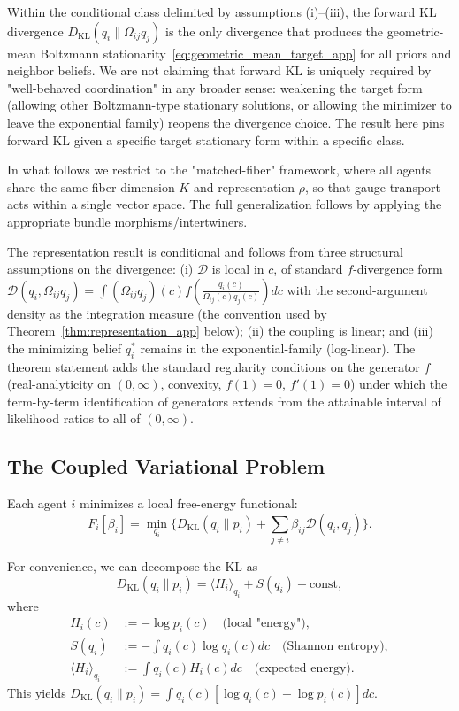 \documentclass[11pt]{article}
\begin{document}
Within the conditional class delimited by assumptions (i)--(iii), the forward KL divergence $D_{\mathrm{KL}}(q_i \| \Omega_{ij} q_j)$ is the only divergence that produces the geometric-mean Boltzmann stationarity~\eqref{eq:geometric_mean_target_app} for all priors and neighbor beliefs. We are not claiming that forward KL is uniquely required by "well-behaved coordination" in any broader sense: weakening the target form (allowing other Boltzmann-type stationary solutions, or allowing the minimizer to leave the exponential family) reopens the divergence choice. The result here pins forward KL given a specific target stationary form within a specific class.

In what follows we restrict to the "matched-fiber" framework, where all agents share the same fiber dimension $K$ and representation $\rho$, so that gauge transport acts within a single vector space. The full generalization follows by applying the appropriate bundle morphisms/intertwiners.

The representation result is conditional and follows from three structural assumptions on the divergence: (i) $\mathcal{D}$ is local in $c$, of standard $f$-divergence form $\displaystyle \mathcal{D}(q_i, \Omega_{ij}q_j) = \int (\Omega_{ij}q_j)(c) f\left(\frac{q_i(c)}{\Omega_{ij}(c) q_j(c)}\right) dc$ with the second-argument density as the integration measure (the convention used by Theorem~\ref{thm:representation_app} below); (ii) the coupling is linear; and (iii) the minimizing belief $q_i^*$ remains in the exponential-family (log-linear). The theorem statement adds the standard regularity conditions on the generator $f$ (real-analyticity on $(0,\infty)$, convexity, $f(1)=0$, $f'(1)=0$) under which the term-by-term identification of generators extends from the attainable interval of likelihood ratios to all of $(0,\infty)$.

\subsection*{The Coupled Variational Problem}

Each agent $i$ minimizes a local free-energy functional:
\begin{equation}
F_i[\beta_i]
=\min_{q_i}
\Big\{
D_{\mathrm{KL}}(q_i \| p_i)
+ \sum_{j\neq i} \beta_{ij}\mathcal{D}(q_i,q_j)
\Big\}.
\label{eq:F_i_app}
\end{equation}

For convenience, we can decompose the KL as
\begin{equation}
D_{\mathrm{KL}}(q_i \| p_i) = \langle H_i \rangle_{q_i} + S(q_i) + \text{const},
\end{equation}
where
\begin{align}
H_i(c) &:= -\log p_i(c) \quad \text{(local "energy")}, \\
S(q_i) &:= -\int q_i(c) \log q_i(c)dc \quad \text{(Shannon entropy)}, \\
\langle H_i \rangle_{q_i} &:= \int q_i(c) H_i(c)dc \quad \text{(expected energy)}.
\end{align}
This yields $D_{\mathrm{KL}}(q_i \| p_i) = \int q_i(c)[\log q_i(c) - \log p_i(c)]dc$.
\end{document}
